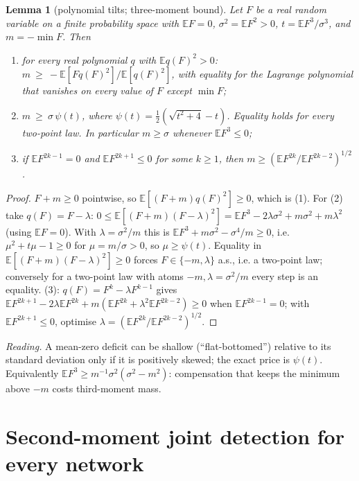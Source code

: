 \documentclass[11pt]{article}
\newtheorem{lemma}[theorem]{Lemma}
\theoremstyle{remark}
\begin{document}
\begin{lemma}[polynomial tilts; three-moment bound]\label{lem:psi}
Let $F$ be a real random variable on a finite probability space with $\mathbb EF=0$, $\sigma^2=\mathbb EF^2>0$,
$t=\mathbb EF^3/\sigma^3$, and $m=-\min F$. Then
\begin{enumerate}
\item for every real polynomial $q$ with $\mathbb Eq(F)^2>0$: $m\ \ge\ -\mathbb E[Fq(F)^2]/\mathbb E[q(F)^2]$, with equality for the
Lagrange polynomial that vanishes on every value of $F$ except $\min F$;
\item $m\ \ge\ \sigma\,\psi(t)$, where $\psi(t)=\tfrac12(\sqrt{t^2+4}-t)$. Equality holds for every two-point law. In particular
$m\ge\sigma$ whenever $\mathbb EF^3\le0$;
\item if $\mathbb EF^{2k-1}=0$ and $\mathbb EF^{2k+1}\le0$ for some $k\ge1$, then $m\ge(\mathbb EF^{2k}/\mathbb EF^{2k-2})^{1/2}$.
\end{enumerate}
\end{lemma}
\begin{proof}
$F+m\ge0$ pointwise, so $\mathbb E[(F+m)q(F)^2]\ge0$, which is (1). For (2) take $q(F)=F-\lambda$:
$0\le\mathbb E[(F+m)(F-\lambda)^2]=\mathbb EF^3-2\lambda\sigma^2+m\sigma^2+m\lambda^2$ (using $\mathbb EF=0$). With $\lambda=\sigma^2/m$ this is
$\mathbb EF^3+m\sigma^2-\sigma^4/m\ge0$, i.e. $\mu^2+t\mu-1\ge0$ for $\mu=m/\sigma>0$, so $\mu\ge\psi(t)$. Equality in
$\mathbb E[(F+m)(F-\lambda)^2]\ge0$ forces $F\in\{-m,\lambda\}$ a.s., i.e. a two-point law; conversely for a two-point law with atoms
$-m,\lambda=\sigma^2/m$ every step is an equality. (3): $q(F)=F^k-\lambda F^{k-1}$ gives
$\mathbb EF^{2k+1}-2\lambda\mathbb EF^{2k}+m(\mathbb EF^{2k}+\lambda^2\mathbb EF^{2k-2})\ge0$ when $\mathbb EF^{2k-1}=0$; with
$\mathbb EF^{2k+1}\le0$, optimise $\lambda=(\mathbb EF^{2k}/\mathbb EF^{2k-2})^{1/2}$.
\end{proof}
\noindent\emph{Reading.} A mean-zero deficit can be shallow (``flat-bottomed'') relative to its standard deviation only if it is
positively skewed; the exact price is $\psi(t)$. Equivalently $\mathbb EF^3\ge m^{-1}\sigma^2(\sigma^2-m^2)$: compensation that keeps the
minimum above $-m$ costs third-moment mass.

\section{Second-moment joint detection for every network}
\end{document}
